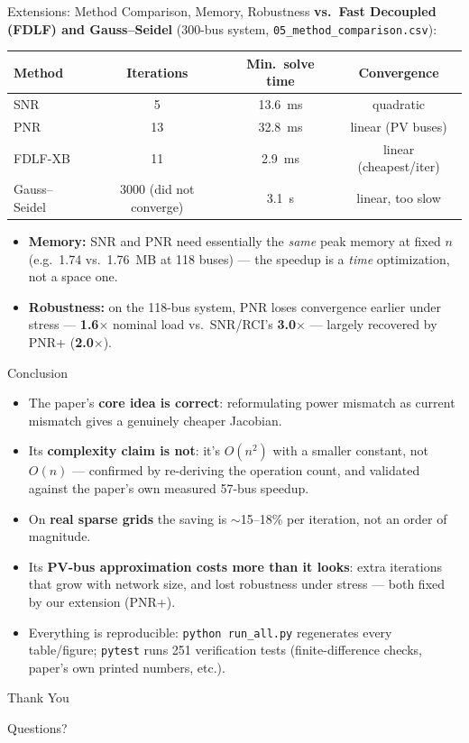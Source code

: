 \documentclass[aspectratio=169,10pt]{beamer}
\begin{document}
\begin{frame}{Extensions: Method Comparison, Memory, Robustness}
  \small
  \textbf{vs.\ Fast Decoupled (FDLF) and Gauss--Seidel} (300-bus system,
  \texttt{05\_method\_comparison.csv}):
  \begin{center}
  \begin{tabular}{lccc}
    \toprule
    Method & Iterations & Min.\ solve time & Convergence \\
    \midrule
    SNR      & 5    & 13.6~ms   & quadratic \\
    PNR      & 13   & 32.8~ms   & linear (PV buses) \\
    FDLF-XB  & 11   & 2.9~ms    & linear (cheapest/iter) \\
    Gauss--Seidel & 3000 (did not converge) & 3.1~s & linear, too slow \\
    \bottomrule
  \end{tabular}
  \end{center}

  \begin{itemize}
    \item \textbf{Memory:} SNR and PNR need essentially the \emph{same}
      peak memory at fixed $n$ (e.g.\ 1.74 vs.\ 1.76~MB at 118 buses) ---
      the speedup is a \emph{time} optimization, not a space one.
    \item \textbf{Robustness:} on the 118-bus system, PNR loses convergence
      earlier under stress --- \textbf{1.6$\times$} nominal load vs.\
      SNR/RCI's \textbf{3.0$\times$} --- largely recovered by PNR+
      (\textbf{2.0$\times$}).
  \end{itemize}
\end{frame}

\begin{frame}{Conclusion}
  \small
  \begin{itemize}
    \item The paper's \textbf{core idea is correct}: reformulating power
      mismatch as current mismatch gives a genuinely cheaper Jacobian.
    \item Its \textbf{complexity claim is not}: it's $O(n^2)$ with a smaller
      constant, not $O(n)$ --- confirmed by re-deriving the operation count,
      and validated against the paper's own measured 57-bus speedup.
    \item On \textbf{real sparse grids} the saving is $\sim$15--18\% per
      iteration, not an order of magnitude.
    \item Its \textbf{PV-bus approximation costs more than it looks}: extra
      iterations that grow with network size, and lost robustness under
      stress --- both fixed by our extension (PNR+).
    \item Everything is reproducible: \texttt{python run\_all.py}
      regenerates every table/figure; \texttt{pytest} runs 251 verification
      tests (finite-difference checks, paper's own printed numbers, etc.).
  \end{itemize}
\end{frame}

\begin{frame}
  \centering
  \Huge Thank You
  \bigskip

  \Large Questions?
\end{frame}
\end{document}
